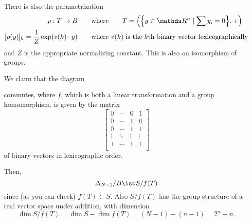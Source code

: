 \documentclass[11pt]{article}
\begin{document}
There is also the parametrization
\begin{align*}
    \rho : T \to B
    &\qquad\text{where}\qquad
    T = \pdil*{\cdil*{y \in \R^n \mid \sum y_i = 0}, +} \\
    [\rho(y)]_k = \frac 1 Z \exp\pdil*{ v(k) \cdot y}
    &\qquad\text{where $v(k)$ is the $k$th binary vector lexicographically}
\end{align*}
and $Z$ is the appropriate normalizing constant.  This is also an isomorphism of
groups.

We claim that the diagram
\begin{center}
\end{center}
commutes, where $f$, which is both a linear transformation and a group
homomorphism, is given by the matrix
\[
    \begin{bmatrix}
        0 & \cdots & 0 & 1 \\
        0 & \cdots & 1 & 0 \\
        0 & \cdots & 1 & 1 \\
        \vdots  & \ddots & \vdots & \vdots \\
        1 & \cdots & 1 & 1 \\
    \end{bmatrix}
\]
of binary vectors in lexicographic order.

Then,
\[
    \Delta_{N-1} / B \iso S / f(T)
\]
since (as you can check)  $f(T) \subset S$.  Also $S / f(T)$ has the group
structure of a real vector space under addition, with dimension 
\[
    \dim S / f(T) = \dim S - \dim f(T) = (N-1) - (n-1) = 2^n - n.
\]
\end{document}
